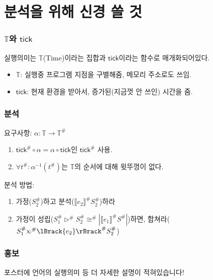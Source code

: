 \documentclass{beamer}
\newcommand*{\A}[1]{{#1}^{\#}}
\newcommand*{\Time}{\mathbb{T}}
\newcommand*{\semlink}{\mathbin{\rotatebox[origin=c]{180}{$\propto$}}}
\newcommand*{\sembracket}[1]{\lBrack{#1}\rBrack}
\newcommand*{\tick}{\mathsf{tick}}
\begin{document}
\section{분석을 위해 신경 쓸 것}
\begin{frame}[c]
  \frametitle{$\Time$와 $\tick$}
  실행의미는 $\Time$(Time)이라는 집합과 $\tick$이라는 함수로 매개화되어있다.
  \begin{itemize}
    \item $\Time$: 실행중 프로그램 지점을 구별해줌, 메모리 주소로도 쓰임.
    \item $\tick$: 현재 환경을 받아서, 증가된(지금껏 안 쓰인) 시간을 줌.
  \end{itemize}
\end{frame}
\begin{frame}[c]
  \frametitle{분석}
  요구사항: $\alpha:\Time\rightarrow\A\Time$
  \begin{enumerate}
    \item $\A\tick\circ\alpha=\alpha\circ\tick$인 $\A\tick$ 사용.
    \item $\forall\A{t}:\alpha^{-1}(\A{t})$는 $\Time$의 순서에 대해 윗뚜껑이 없다.
  \end{enumerate}
  분석 방법:
  \begin{enumerate}
    \item 가정($\A{S}_2$)하고 분석($\A{\sembracket{e_2}}\A{S}_2$)하라
    \item 가정이 성립($\A{S}_1\A\rhd\A{S}_2\A\cong|\A{\sembracket{e_1}}\A{S}|$)하면, 합쳐라($\A{S}_1\A\semlink\A{\sembracket{e_2}}\A{S}_2$)
  \end{enumerate}
\end{frame}
\begin{frame}[c]
  \frametitle{홍보}
  \begin{center}
    포스터에 언어의 실행의미 등 더 자세한 설명이 적혀있습니다!
  \end{center}
\end{frame}
\end{document}

